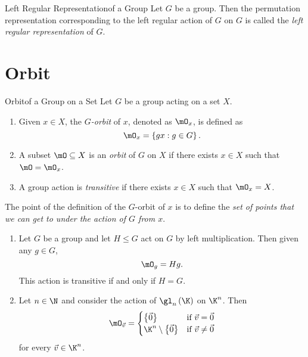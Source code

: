 \documentclass[pmath347]{subfiles}
\begin{document}
    \begin{definition}{Left Regular Representation}{of a Group}
        Let $G$ be a group. Then the permutation representation corresponding to the left regular action of $G$ on $G$ is called the \emph{left regular representation} of $G$.
    \end{definition}

    \section{Orbit}
    
    \begin{definition}{Orbit}{of a Group on a Set}
        Let $G$ be a group acting on a set $X$.
        \begin{enumerate}
            \item Given $x\in X$, the \emph{$G$-orbit} of $x$, denoted as $\mO_x$, is defined as
                \begin{equation*}
                    \mO_x = \left\lbrace gx:g\in G \right\rbrace .
                \end{equation*}
            \item A subset $\mO\subseteq X$ is an \emph{orbit} of $G$ on $X$ if there exists $x\in X$ such that $\mO=\mO_x$.
            \item A group action is \emph{transitive} if there exists $x\in X$ such that $\mO_x = X$.
        \end{enumerate}
    \end{definition}

    \np The point of the definition of the $G$-orbit of $x$ is to define the \textit{set of points that we can get to under the action of $G$ from $x$}.

    \ex
    \begin{enumerate}
        \item Let $G$ be a group and let $H\leq G$ act on $G$ by left multiplication. Then given any $g\in G$,
            \begin{equation*}
                \mO_g = Hg.
            \end{equation*}
            This action is transitive if and only if $H=G$.
        \item Let $n\in\N$ and consider the action of $\gl_n\left( \K \right) $ on $\K^n$. Then
            \begin{equation*}
                \mO_{\vec{v}} = 
                \begin{cases} 
                    \left\lbrace \vec{0} \right\rbrace  & \text{if }\vec{v}=\vec{0} \\
                    \K^n\setminus \left\lbrace \vec{0} \right\rbrace & \text{if }\vec{v}\neq \vec{0}
                \end{cases}
            \end{equation*}
            for every $\vec{v}\in\K^n$.
    \end{enumerate}
\end{document}
